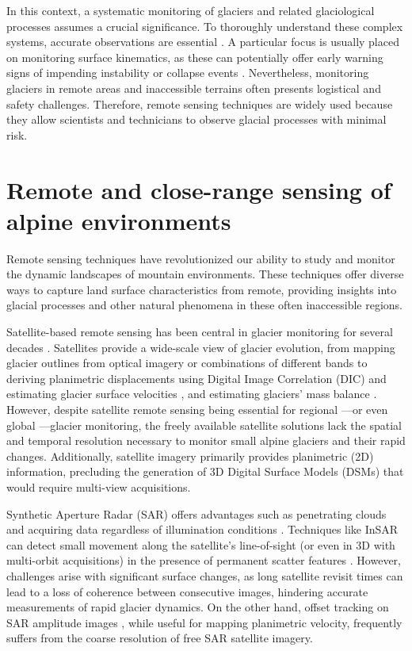 In this context, a systematic monitoring of glaciers and related glaciological processes assumes a crucial significance.
To thoroughly understand these complex systems, accurate observations are essential \citep{Kaab2005}.
A particular focus is usually placed on monitoring surface kinematics, as these can potentially offer early warning signs of impending instability or collapse events \citep{Faillettaz2015}.
Nevertheless, monitoring glaciers in remote areas and inaccessible terrains often presents logistical and safety challenges.
Therefore, remote sensing techniques are widely used because they allow scientists and technicians to observe glacial processes with minimal risk. 

\section{Remote and close-range sensing of alpine environments}

Remote sensing techniques have revolutionized our ability to study and monitor the dynamic landscapes of mountain environments. 
These techniques offer diverse ways to capture land surface characteristics from remote, providing insights into glacial processes and other natural phenomena in these often inaccessible regions.

Satellite-based remote sensing has been central in glacier monitoring for several decades \citep{Paul2007}. 
Satellites provide a wide-scale view of glacier evolution, from mapping glacier outlines from optical imagery or combinations of different bands \cite{Hall1995, Paul_2002, Winsvold2016} to deriving planimetric displacements using Digital Image Correlation (DIC) and estimating glacier surface velocities \cite{Scambos1992, Kaab2005, Scherler2008, altena_kaab_2020}, and estimating glaciers' mass balance \cite{Bamber2007, Berthier2016, Rabatel2017, Berthier2023}.
However, despite satellite remote sensing being essential for regional —or even global —glacier monitoring, the freely available satellite solutions lack the spatial and temporal resolution necessary to monitor small alpine glaciers and their rapid changes.
Additionally, satellite imagery primarily provides planimetric (2D) information, precluding the generation of 3D Digital Surface Models (DSMs) that would require multi-view acquisitions.

Synthetic Aperture Radar (SAR) offers advantages such as penetrating clouds and acquiring data regardless of illumination conditions \citep{Fang2016, Winsvold2018, Strozzi2020}. 
Techniques like InSAR can detect small movement along the satellite's line-of-sight (or even in 3D with multi-orbit acquisitions) in the presence of permanent scatter features \citep{schubert2013glacier}.
However, challenges arise with significant surface changes, as long satellite revisit times can lead to a loss of coherence between consecutive images, hindering accurate measurements of rapid glacier dynamics.
On the other hand, offset tracking on SAR amplitude images \citep{schellenberger2015sar}, while useful for mapping planimetric velocity, frequently suffers from the coarse resolution of free SAR satellite imagery.

